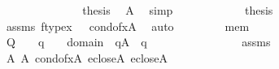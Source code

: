\begin{isabellebody}
\ \ \ \ \ \ \isamarkupfalse%
\isanewline
\ \ \ \ \ \ \isamarkupfalse%
\ {\isacharquery}{\kern0pt}thesis\ \isamarkupfalse%
\ A\ \isamarkupfalse%
\ simp\isanewline
\ \ \ \ \isamarkupfalse%
\isanewline
\ \ \ \ \isamarkupfalse%
\ \isamarkupfalse%
\ {\isacharquery}{\kern0pt}thesis\ \isamarkupfalse%
\ assms{\isacharparenleft}{\kern0pt}{}{\isacharparenright}{\kern0pt}\ {\isacartoucheopen}ftype{\isacharparenleft}{\kern0pt}x{\isacharparenright}{\kern0pt}\ {\isacharequal}{\kern0pt}\ {}{\isacartoucheclose}\ {\isacartoucheopen}cond{\isacharunderscore}{\kern0pt}of{\isacharparenleft}{\kern0pt}x{\isacharparenright}{\kern0pt}{\isasymin}A{}{\isacartoucheclose}\ \isamarkupfalse%
\ auto\isanewline
\ \ \isamarkupfalse%
\isanewline
\ \ \ \ \isamarkupfalse%
\ mem\isanewline
\ \ \ \ \isamarkupfalse%
\ {\isachardoublequoteopen}Q{\isacharparenleft}{\kern0pt}{}{\isacharcomma}{\kern0pt}\ {\isacharquery}{\kern0pt}{\isasymtau}{\isacharcomma}{\kern0pt}\ \ {\isasymsigma}{\isacharcomma}{\kern0pt}\ q{\isacharparenright}{\kern0pt}{\isachardoublequoteclose}\ \ {\isachardoublequoteopen}{\isasymsigma}\ {\isasymin}\ domain{\isacharparenleft}{\kern0pt}{\isacharquery}{\kern0pt}{\isasymtheta}{\isacharparenright}{\kern0pt}{\isachardoublequoteclose}\ \ {\isachardoublequoteopen}q{\isasymin}A{}{\isachardoublequoteclose}\ \ q\ {\isasymsigma}\isanewline
\ \ \ \ \isamarkupfalse%
\ {\isacharminus}{\kern0pt}\isanewline
\ \ \ \ \ \ \isamarkupfalse%
\ {}\ assms\isanewline
\ \ \ \ \ \ \isamarkupfalse%
\ {\isachardoublequoteopen}{\isacharquery}{\kern0pt}{\isasymtau}{\isasymin}A{}{\isachardoublequoteclose}\ {\isachardoublequoteopen}{\isacharquery}{\kern0pt}{\isasymtheta}{\isasymin}A{}{\isachardoublequoteclose}\ {\isachardoublequoteopen}cond{\isacharunderscore}{\kern0pt}of{\isacharparenleft}{\kern0pt}x{\isacharparenright}{\kern0pt}{\isasymin}A{}{\isachardoublequoteclose}\ {\isachardoublequoteopen}{\isacharquery}{\kern0pt}{\isasymtau}{\isasymin}eclose{\isacharparenleft}{\kern0pt}A{}{\isacharparenright}{\kern0pt}{\isachardoublequoteclose}\ {\isachardoublequoteopen}{\isacharquery}{\kern0pt}{\isasymtheta}{\isasymin}eclose{\isacharparenleft}{\kern0pt}A{}{\isacharparenright}{\kern0pt}{\isachardoublequoteclose}\isanewline

\end{isabellebody}
